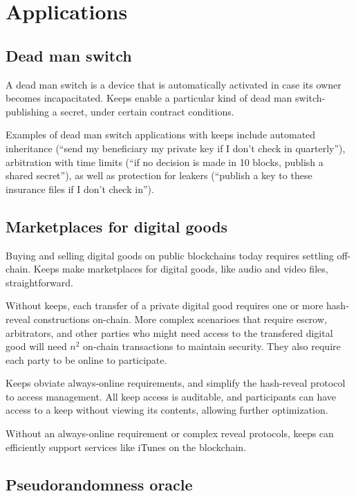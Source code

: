 \documentclass[11pt]{article}
\begin{document}
\section{Applications}

\subsection{Dead man switch}

A dead man switch is a device that is automatically activated in case
its owner becomes incapacitated. Keeps enable a particular kind of
dead man switch- publishing a secret, under certain contract
conditions.

Examples of dead man switch applications with keeps include automated
inheritance (``send my beneficiary my private key if I don't check in
quarterly''), arbitration with time limits (``if no decision is made in
10 blocks, publish a shared secret''), as well as protection for
leakers (``publish a key to these insurance files if I don't check
in'').

\subsection{Marketplaces for digital goods}

Buying and selling digital goods on public blockchains today requires
settling off-chain. Keeps make marketplaces for digital goods, like
audio and video files, straightforward.

Without keeps, each transfer of a private digital good requires one or
more hash-reveal constructions on-chain. More complex scenarioes
that require escrow, arbitrators, and other parties who might need
access to the transfered digital good will need ${n^2}$ on-chain
transactions to maintain security. They also require each party to be
online to participate.

Keeps obviate always-online requirements, and simplify the hash-reveal
protocol to access management. All keep access is auditable, and
participants can have access to a keep without viewing its contents,
allowing further optimization.

Without an always-online requirement or complex reveal protocols,
keeps can efficiently support services like iTunes on the blockchain.

\subsection{Pseudorandomness oracle}
\end{document}
